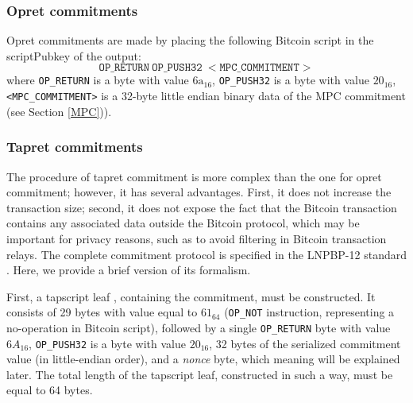\documentclass[9pt,oneside]{amsart}
\begin{document}
\begin{multicols}{2}
\subsubsection{Opret commitments}\label{Opret}

Opret commitments are made by placing the following Bitcoin script in the \textsf{scriptPubkey}
of the output:
\noindent
\begin{equation}
    \mathtt{OP\_RETURN\ OP\_PUSH32\ <MPC\_COMMITMENT>}
\end{equation}
where \verb|OP_RETURN| is a byte with value $\mathrm{6a}_{16}$,
\verb|OP_PUSH32| is a byte with value $20_{16}$,
\verb|<MPC_COMMITMENT>| is a 32-byte little endian binary data of the MPC commitment
(see Section \ref{MPC})).

\subsubsection{Tapret commitments}\label{Tapret}

The procedure of tapret commitment is more complex than the one for opret commitment;
however, it has several advantages.
First, it does not increase the transaction size;
second, it does not expose the fact that the Bitcoin transaction contains any associated
data outside the Bitcoin protocol, which may be important for privacy reasons,
such as to avoid filtering in Bitcoin transaction relays.
The complete commitment protocol is specified in the LNPBP-12 standard \cite{LNPBP12}.
Here, we provide a brief version of its formalism.

First, a tapscript leaf \cite{BIP342}, containing the commitment, must be constructed.
It consists of 29 bytes with value equal to $61_{64}$
(\texttt{OP\_NOT} instruction, representing a no-operation in Bitcoin script),
followed by a single \texttt{OP\_RETURN} byte with value $6A_{16}$,
\texttt{OP\_PUSH32} is a byte with value $20_{16}$,
32 bytes of the serialized commitment value (in little-endian order),
and a \emph{nonce} byte, which meaning will be explained later.
The total length of the tapscript leaf, constructed in such a way, must be equal to 64 bytes.


\end{multicols}
\end{document}
